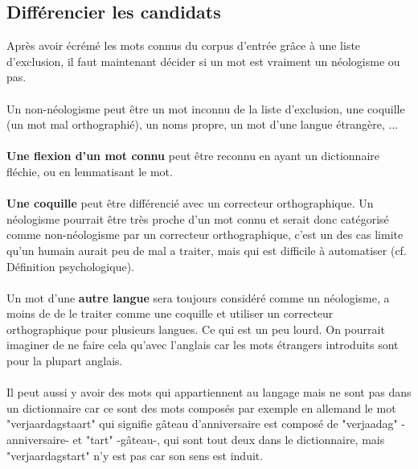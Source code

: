 \documentclass{article}
\begin{document}
\subsection{Différencier les candidats}

Après avoir écrémé les mots connus du corpus d'entrée grâce à une liste d'exclusion, il faut maintenant décider si un mot est vraiment un néologisme ou pas.
\paragraph*{}
Un non-néologisme peut être un mot inconnu de la liste d'exclusion, une coquille (un mot mal orthographié), un noms propre, un mot d'une langue étrangère, ...
\paragraph*{}
\textbf{Une flexion d'un mot connu} peut être reconnu en ayant un dictionnaire fléchie, ou en lemmatisant le mot.
\paragraph*{}
\textbf{Une coquille} peut être différencié avec un correcteur orthographique. Un néologisme pourrait être très proche d'un mot connu et serait donc catégorisé comme non-néologisme par un correcteur orthographique, c'est un des cas limite  qu'un humain aurait peu de mal a traiter, mais qui est difficile à automatiser (cf. Définition psychologique).
\paragraph*{}
Un mot d'une \textbf{autre langue} sera toujours considéré comme un néologisme, a moins de de le traiter comme une coquille et utiliser un correcteur orthographique pour plusieurs langues. Ce qui est un peu lourd. On pourrait imaginer de ne faire cela qu'avec l'anglais car les mots étrangers introduits sont pour la plupart anglais.
\paragraph*{}
Il peut aussi y avoir des mots qui appartiennent au langage mais ne sont pas dans un dictionnaire car ce sont des mots composés par exemple en allemand le mot "verjaardagstaart" qui signifie gâteau d’anniversaire est composé de "verjaadag" -anniversaire- et "tart" -gâteau-, qui sont tout deux dans le dictionnaire, mais "verjaardagstart" n'y est pas car son sens est induit.
\end{document}
